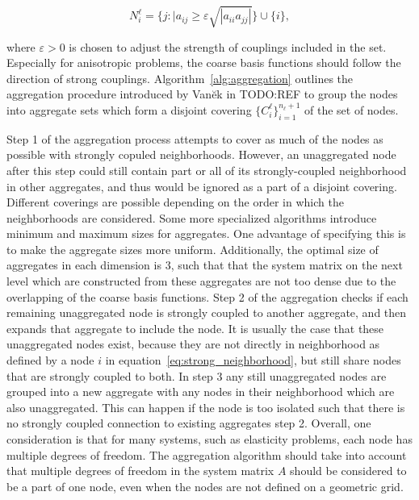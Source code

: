 \begin{equation}
	\label{eq:strong_neighborhood}
	N_i^\ell = \{ { j : |a_{ij} \geq \varepsilon \sqrt{|a_{ii} a_{jj} |}} \} \cup \{ i \},
\end{equation}

where $\varepsilon > 0$ is chosen to adjust the strength of couplings included in the set. Especially for anisotropic problems, the coarse basis functions should follow the direction of strong couplings. Algorithm~\ref{alg:aggregation} outlines the aggregation procedure introduced by Van\u{e}k in TODO:REF to group the nodes into aggregate sets which form a disjoint covering $\{C_i^\ell\}_{i=1}^{n_\ell + 1}$ of the set of nodes.

Step 1 of the aggregation process attempts to cover as much of the nodes as possible with strongly copuled neighborhoods. However, an unaggregated node after this step could still contain part or all of its strongly-coupled neighborhood in other aggregates, and thus would be ignored as a part of a disjoint covering. Different coverings are possible depending on the order in which the neighborhoods are considered. Some more specialized algorithms introduce minimum and maximum sizes for aggregates. One advantage of specifying this is to make the aggregate sizes more uniform. Additionally, the optimal size of aggregates in each dimension is 3, such that that the system matrix on the next level which are constructed from these aggregates are not too dense due to the overlapping of the coarse basis functions. Step 2 of the aggregation checks if each remaining unaggregated node is strongly coupled to another aggregate, and then expands that aggregate to include the node. It is usually the case that these unaggregated nodes exist, because they are not directly in neighborhood as defined by a node $i$ in equation~\ref{eq:strong_neighborhood}, but still share nodes that are strongly coupled to both. In step 3 any still unaggregated nodes are grouped into a new aggregate with any nodes in their neighborhood which are also unaggregated. This can happen if the node is too isolated such that there is no strongly coupled connection to existing aggregates step 2. Overall, one consideration is that for many systems, such as elasticity problems, each node has multiple degrees of freedom. The aggregation algorithm should take into account that multiple degrees of freedom in the system matrix $A$ should be considered to be a part of one node, even when the nodes are not defined on a geometric grid.

